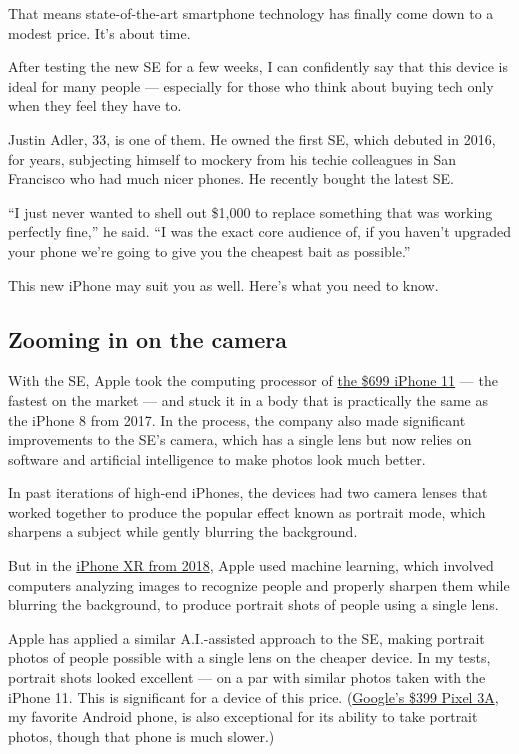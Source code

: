 That means state-of-the-art smartphone technology has finally come down
to a modest price. It's about time.

After testing the new SE for a few weeks, I can confidently say that
this device is ideal for many people --- especially for those who think
about buying tech only when they feel they have to.

Justin Adler, 33, is one of them. He owned the first SE, which debuted
in 2016, for years, subjecting himself to mockery from his techie
colleagues in San Francisco who had much nicer phones. He recently
bought the latest SE.

``I just never wanted to shell out \$1,000 to replace something that was
working perfectly fine,'' he said. ``I was the exact core audience of,
if you haven't upgraded your phone we're going to give you the cheapest
bait as possible.''

This new iPhone may suit you as well. Here's what you need to know.

\hypertarget{zooming-in-on-the-camera}{%
\subsection{Zooming in on the camera}\label{zooming-in-on-the-camera}}

With the SE, Apple took the computing processor of
\href{https://www.nytimes3xbfgragh.onion/2019/09/17/technology/personaltech/iphone-11-review.html}{the
\$699 iPhone 11} --- the fastest on the market --- and stuck it in a
body that is practically the same as the iPhone 8 from 2017. In the
process, the company also made significant improvements to the SE's
camera, which has a single lens but now relies on software and
artificial intelligence to make photos look much better.

In past iterations of high-end iPhones, the devices had two camera
lenses that worked together to produce the popular effect known as
portrait mode, which sharpens a subject while gently blurring the
background.

But in the
\href{https://www.nytimes3xbfgragh.onion/2018/10/23/technology/personaltech/apple-iphone-xr-review.html}{iPhone
XR from 2018}, Apple used machine learning, which involved computers
analyzing images to recognize people and properly sharpen them while
blurring the background, to produce portrait shots of people using a
single lens.

Apple has applied a similar A.I.-assisted approach to the SE, making
portrait photos of people possible with a single lens on the cheaper
device. In my tests, portrait shots looked excellent --- on a par with
similar photos taken with the iPhone 11. This is significant for a
device of this price.
(\href{https://www.nytimes3xbfgragh.onion/2019/05/07/technology/personaltech/pixel-3a.html}{Google's
\$399 Pixel 3A}, my favorite Android phone, is also exceptional for its
ability to take portrait photos, though that phone is much slower.)


